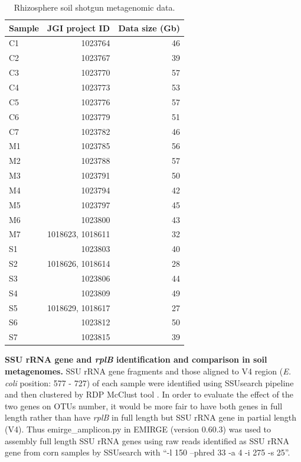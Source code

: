 \documentclass[]{msu-thesis}
\begin{document}
\begin{table}[htbp]
  \centering
  \caption[Rhizosphere soil shotgun metagenomic data]{Rhizosphere soil shotgun metagenomic data. }
    \begin{tabular}{|lrr|}
    \toprule
    Sample & \multicolumn{1}{l}{JGI project ID} & \multicolumn{1}{l|}{Data size (Gb)} \\
    \midrule
    C1    & 1023764 & 46 \\
    C2    & 1023767 & 39 \\
    C3    & 1023770 & 57 \\
    C4    & 1023773 & 53 \\
    C5    & 1023776 & 57 \\
    C6    & 1023779 & 51 \\
    C7    & 1023782 & 46 \\
    M1    & 1023785 & 56 \\
    M2    & 1023788 & 57 \\
    M3    & 1023791 & 50 \\
    M4    & 1023794 & 42 \\
    M5    & 1023797 & 45 \\
    M6    & 1023800 & 43 \\
    M7    & \multicolumn{1}{l}{1018623, 1018611} & 32 \\
    S1    & 1023803 & 40 \\
    S2    & \multicolumn{1}{l}{1018626, 1018614} & 28 \\
    S3    & 1023806 & 44 \\
    S4    & 1023809 & 49 \\
    S5    & \multicolumn{1}{l}{1018629, 1018617} & 27 \\
    S6    & 1023812 & 50 \\
    S7    & 1023815 & 39 \\
    \bottomrule
    \end{tabular}%
  \label{tab:S1}%
\end{table}%



\textbf{SSU rRNA gene and \textit{rplB} identification and comparison in soil metagenomes. }
SSU rRNA gene fragments and those aligned to V4 region (\textit{E. coli} position: 577 - 727) of each sample were identified using SSUsearch pipeline \cite{guo_microbial_2015} and then clustered by RDP McClust tool \cite{cole_ribosomal_2014}. In order to evaluate the effect of the two genes on OTUs number, it would be more fair to have both genes in full length rather than have \textit{rplB} in full length but SSU rRNA gene in partial length (V4). Thus emirge\_amplicon.py in EMIRGE (version 0.60.3) \cite{miller_short-read_2013} was used to assembly full length SSU rRNA genes using raw reads identified as SSU rRNA gene from corn samples by SSUsearch with ``-l 150 --phred 33 -a 4 -i 275 -s 25''.
\end{document}
